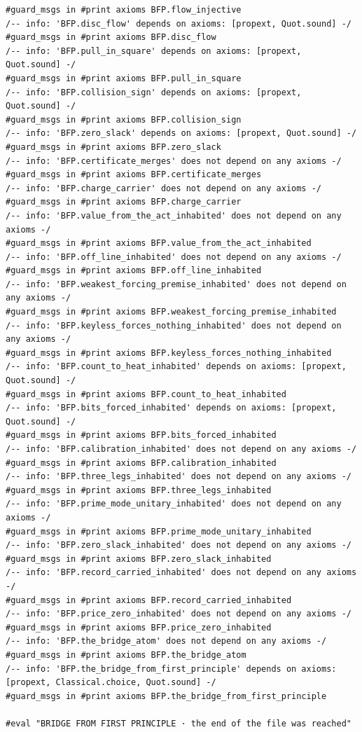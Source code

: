 \documentclass[10pt,twocolumn]{article}
\begin{document}
\begin{Verbatim}
#guard_msgs in #print axioms BFP.flow_injective
/-- info: 'BFP.disc_flow' depends on axioms: [propext, Quot.sound] -/
#guard_msgs in #print axioms BFP.disc_flow
/-- info: 'BFP.pull_in_square' depends on axioms: [propext, Quot.sound] -/
#guard_msgs in #print axioms BFP.pull_in_square
/-- info: 'BFP.collision_sign' depends on axioms: [propext, Quot.sound] -/
#guard_msgs in #print axioms BFP.collision_sign
/-- info: 'BFP.zero_slack' depends on axioms: [propext, Quot.sound] -/
#guard_msgs in #print axioms BFP.zero_slack
/-- info: 'BFP.certificate_merges' does not depend on any axioms -/
#guard_msgs in #print axioms BFP.certificate_merges
/-- info: 'BFP.charge_carrier' does not depend on any axioms -/
#guard_msgs in #print axioms BFP.charge_carrier
/-- info: 'BFP.value_from_the_act_inhabited' does not depend on any axioms -/
#guard_msgs in #print axioms BFP.value_from_the_act_inhabited
/-- info: 'BFP.off_line_inhabited' does not depend on any axioms -/
#guard_msgs in #print axioms BFP.off_line_inhabited
/-- info: 'BFP.weakest_forcing_premise_inhabited' does not depend on any axioms -/
#guard_msgs in #print axioms BFP.weakest_forcing_premise_inhabited
/-- info: 'BFP.keyless_forces_nothing_inhabited' does not depend on any axioms -/
#guard_msgs in #print axioms BFP.keyless_forces_nothing_inhabited
/-- info: 'BFP.count_to_heat_inhabited' depends on axioms: [propext, Quot.sound] -/
#guard_msgs in #print axioms BFP.count_to_heat_inhabited
/-- info: 'BFP.bits_forced_inhabited' depends on axioms: [propext, Quot.sound] -/
#guard_msgs in #print axioms BFP.bits_forced_inhabited
/-- info: 'BFP.calibration_inhabited' does not depend on any axioms -/
#guard_msgs in #print axioms BFP.calibration_inhabited
/-- info: 'BFP.three_legs_inhabited' does not depend on any axioms -/
#guard_msgs in #print axioms BFP.three_legs_inhabited
/-- info: 'BFP.prime_mode_unitary_inhabited' does not depend on any axioms -/
#guard_msgs in #print axioms BFP.prime_mode_unitary_inhabited
/-- info: 'BFP.zero_slack_inhabited' does not depend on any axioms -/
#guard_msgs in #print axioms BFP.zero_slack_inhabited
/-- info: 'BFP.record_carried_inhabited' does not depend on any axioms -/
#guard_msgs in #print axioms BFP.record_carried_inhabited
/-- info: 'BFP.price_zero_inhabited' does not depend on any axioms -/
#guard_msgs in #print axioms BFP.price_zero_inhabited
/-- info: 'BFP.the_bridge_atom' does not depend on any axioms -/
#guard_msgs in #print axioms BFP.the_bridge_atom
/-- info: 'BFP.the_bridge_from_first_principle' depends on axioms: [propext, Classical.choice, Quot.sound] -/
#guard_msgs in #print axioms BFP.the_bridge_from_first_principle

#eval "BRIDGE FROM FIRST PRINCIPLE · the end of the file was reached"
\end{Verbatim}
\end{document}
